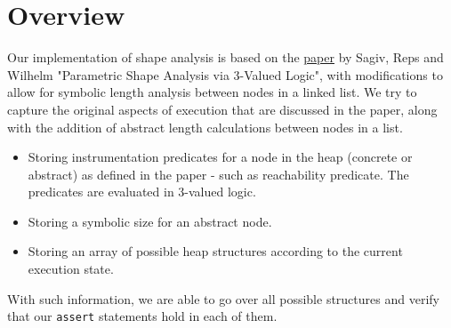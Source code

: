 \section*{Overview}
Our implementation of shape analysis is based on the \href{https://www.cs.tau.ac.il/~msagiv/toplas02.pdf}{paper} by Sagiv, Reps and Wilhelm "Parametric Shape Analysis via 3-Valued Logic", with modifications to allow for symbolic length analysis between nodes in a linked list. We try to capture the original aspects of execution that are discussed in the paper, along with the addition of abstract length calculations between nodes in a list.
\begin{itemize}
	\item Storing instrumentation predicates for a node in the heap (concrete or abstract) as defined in the paper - such as reachability predicate. The predicates are evaluated in 3-valued logic.
	\item Storing a symbolic size for an abstract node.
	\item Storing an array of possible heap structures according to the current execution state.
\end{itemize}
With such information, we are able to go over all possible structures and verify that our \texttt{assert} statements hold in each of them.